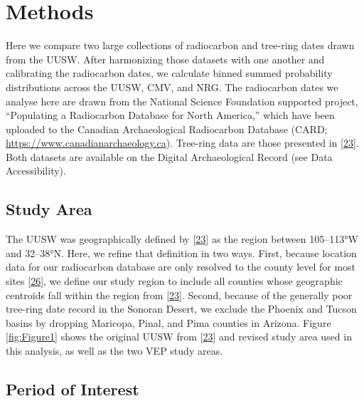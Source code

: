 \documentclass[
]{sa}
\begin{document}
\hypertarget{methods}{%
\section*{Methods}\label{methods}}

Here we compare two large collections of radiocarbon and tree-ring dates drawn from the UUSW. After harmonizing those datasets with one another and calibrating the radiocarbon dates, we calculate binned summed probability distributions across the UUSW, CMV, and NRG. The radiocarbon dates we analyse here are drawn from the National Science Foundation supported project, ``Populating a Radiocarbon Database for North America,'' which have been uploaded to the Canadian Archaeological Radiocarbon Database (CARD; \url{https://www.canadianarchaeology.ca}). Tree-ring data are those presented in {[}\protect\hyperlink{ref-Bocinsky2016}{23}{]}. Both datasets are available on the Digital Archaeological Record (see Data Accessibility).

\hypertarget{study-area}{%
\subsection*{Study Area}\label{study-area}}

The UUSW was geographically defined by {[}\protect\hyperlink{ref-Bocinsky2016}{23}{]} as the region between 105--113°W and 32--38°N. Here, we refine that definition in two ways. First, because location data for our radiocarbon database are only resolved to the county level for most sites {[}\protect\hyperlink{ref-Robinson2019}{26}{]}, we define our study region to include all counties whose geographic centroids fall within the region from {[}\protect\hyperlink{ref-Bocinsky2016}{23}{]}. Second, because of the generally poor tree-ring date record in the Sonoran Desert, we exclude the Phoenix and Tucson basins by dropping Maricopa, Pinal, and Pima counties in Arizona. Figure \ref{fig:Figure1} shows the original UUSW from {[}\protect\hyperlink{ref-Bocinsky2016}{23}{]} and revised study area used in this analysis, as well as the two VEP study areas.

\hypertarget{period-of-interest}{%
\subsection*{Period of Interest}\label{period-of-interest}}
\end{document}
